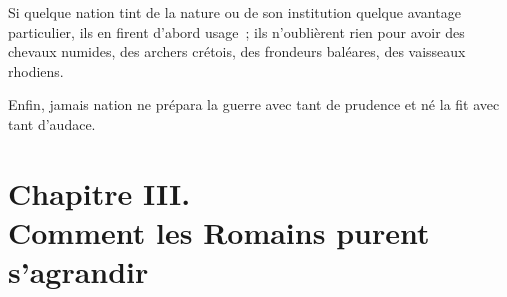 \documentclass[french,twoside]{book} %
\newcommand\chapteropen{} %
\newcommand\chapterclose{} %
\begin{document}
Si quelque nation tint de la nature ou de son institution quelque avantage particulier, ils en firent d’abord usage ; ils n’oublièrent rien pour avoir des chevaux numides, des archers crétois, des frondeurs baléares, des vaisseaux rhodiens.\par
Enfin, jamais nation ne prépara la guerre avec tant de prudence et né la fit avec tant d’audace.
\chapterclose


\chapteropen
\chapter[{Chapitre III. Comment les Romains purent s’agrandir}]{Chapitre III. \\
Comment les Romains purent s’agrandir}
\label{considérations\_Romains\_chap\_03}\renewcommand{\leftmark}{Chapitre III. \\
Comment les Romains purent s’agrandir}
\end{document}
